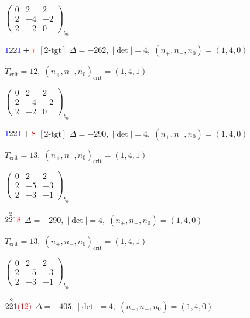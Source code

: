 \documentclass[10pt]{article}
\begin{document}
\hspace{2em}$\left(\begin{smallmatrix}0 & 2 & 2 \\ 2 & -4 & -2 \\ 2 & -2 & 0\end{smallmatrix}\right)_{\!b_0}$

\smallskip

$\textcolor{blue}{1}22\textcolor{blue}{1}+\textcolor{red}{7}$ $\scriptstyle [2\text{-tgt}]$ \quad $\Delta=-262,\; |\det|=4,\; (n_+,n_-,n_0)=(1,4,0)$

\hspace{1em}$T_{\text{crit}}=12,\; (n_+,n_-,n_0)_{\text{crit}}=(1,4,1)$

\hspace{2em}$\left(\begin{smallmatrix}0 & 2 & 2 \\ 2 & -4 & -2 \\ 2 & -2 & 0\end{smallmatrix}\right)_{\!b_0}$

$\textcolor{blue}{1}22\textcolor{blue}{1}+\textcolor{red}{8}$ $\scriptstyle [2\text{-tgt}]$ \quad $\Delta=-290,\; |\det|=4,\; (n_+,n_-,n_0)=(1,4,0)$

\hspace{1em}$T_{\text{crit}}=13,\; (n_+,n_-,n_0)_{\text{crit}}=(1,4,1)$

\hspace{2em}$\left(\begin{smallmatrix}0 & 2 & 2 \\ 2 & -5 & -3 \\ 2 & -3 & -1\end{smallmatrix}\right)_{\!b_0}$

\smallskip

$2\overset{2}{2}1\textcolor{red}{8}$ \quad $\Delta=-290,\; |\det|=4,\; (n_+,n_-,n_0)=(1,4,0)$

\hspace{1em}$T_{\text{crit}}=13,\; (n_+,n_-,n_0)_{\text{crit}}=(1,4,1)$

\hspace{2em}$\left(\begin{smallmatrix}0 & 2 & 2 \\ 2 & -5 & -3 \\ 2 & -3 & -1\end{smallmatrix}\right)_{\!b_0}$

$2\overset{2}{2}1\textcolor{red}{(12)}$ \quad $\Delta=-405,\; |\det|=4,\; (n_+,n_-,n_0)=(1,4,0)$
\end{document}
